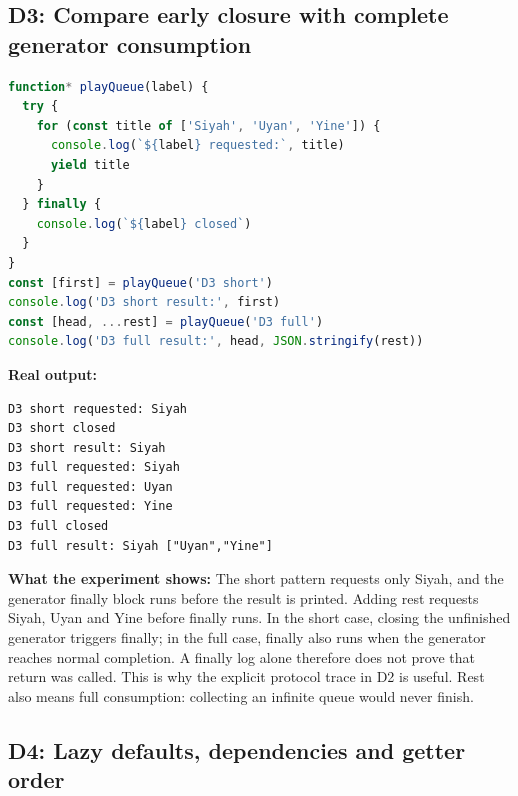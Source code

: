 \documentclass[
  10pt,
  a4paper,
  titlepage]{article}
\begin{document}
\subsection{D3: Compare early closure with complete generator
consumption}\label{d3-compare-early-closure-with-complete-generator-consumption}

\Needspace{82.4pt}
\begin{lstlisting}[language=JavaScript]
function* playQueue(label) {
  try {
    for (const title of ['Siyah', 'Uyan', 'Yine']) {
      console.log(`${label} requested:`, title)
      yield title
    }
  } finally {
    console.log(`${label} closed`)
  }
}
const [first] = playQueue('D3 short')
console.log('D3 short result:', first)
const [head, ...rest] = playQueue('D3 full')
console.log('D3 full result:', head, JSON.stringify(rest))
\end{lstlisting}


\textbf{Real output:}

\Needspace{82.4pt}
\begin{lstlisting}
D3 short requested: Siyah
D3 short closed
D3 short result: Siyah
D3 full requested: Siyah
D3 full requested: Uyan
D3 full requested: Yine
D3 full closed
D3 full result: Siyah ["Uyan","Yine"]
\end{lstlisting}

\textbf{What the experiment shows:} The short pattern requests only
Siyah, and the generator finally block runs before the result is
printed. Adding rest requests Siyah, Uyan and Yine before finally runs.
In the short case, closing the unfinished generator triggers finally; in
the full case, finally also runs when the generator reaches normal
completion. A finally log alone therefore does not prove that return was
called. This is why the explicit protocol trace in D2 is useful. Rest
also means full consumption: collecting an infinite queue would never
finish.

\subsection{D4: Lazy defaults, dependencies and getter
order}\label{d4-lazy-defaults-dependencies-and-getter-order}
\end{document}
